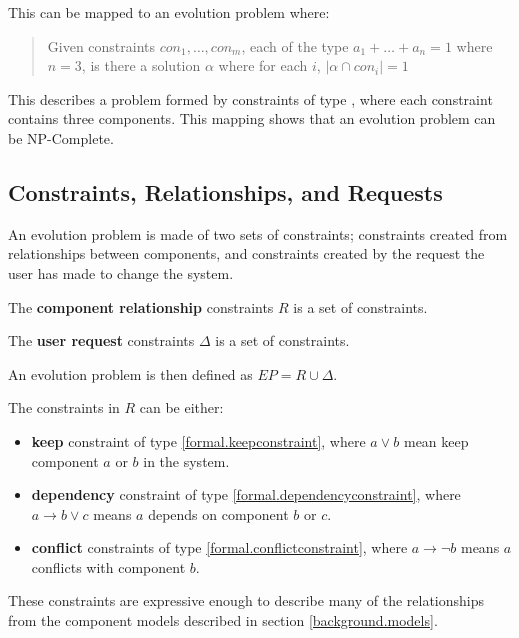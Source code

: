 This can be mapped to an evolution problem where:
\begin{quote}
Given constraints $con_1,\ldots,con_m$, each of the type  $a_1 + \ldots + a_n = 1$ where $n = 3$, is there a solution $\alpha$ where for each $i$, $|\alpha \cap con_i|  =  1$
\end{quote}
This describes a problem formed by constraints of type \label{formal.upgradeconstraint}, where each constraint contains three components.
This mapping shows that an evolution problem can be NP-Complete.

\subsection{Constraints, Relationships, and Requests}
\label{formal.constraints}
An evolution problem is made of two sets of constraints; constraints created from relationships between components, 
and constraints created by the request the user has made to change the system.

\begin{defs}
The \textbf{component relationship} constraints $R$ is a set of constraints.
\end{defs}

\begin{defs}
The \textbf{user request} constraints $\Delta$ is a set of constraints.
\end{defs}
An evolution problem is then defined as $EP = R \cup \Delta$.

The constraints in $R$ can be either: 
\begin{itemize}
  \item \textbf{keep} constraint of type \ref{formal.keepconstraint}, where $a \vee b$ mean keep component $a$ or $b$ in the system.
  \item \textbf{dependency} constraint of type \ref{formal.dependencyconstraint}, where $a \rightarrow b \vee c$ means $a$ depends on component $b$ or $c$.
  \item \textbf{conflict} constraints of type \ref{formal.conflictconstraint},  where $a \rightarrow \neg b$ means $a$ conflicts with component $b$.
\end{itemize}
These constraints are expressive enough to describe many of the relationships from the component models described in section \ref{background.models}.

